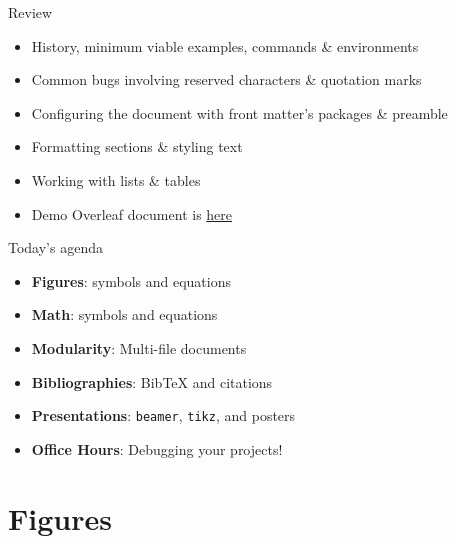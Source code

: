\documentclass{cubeamer}
\begin{document}
\begin{frame}{Review}
    \begin{itemize}
        \item History, minimum viable examples, commands \& environments
        \item Common bugs involving reserved characters \& quotation marks
        \item Configuring the document with front matter's packages \& preamble
        \item Formatting sections \& styling text
        \item Working with lists \& tables
        \item Demo Overleaf document is \href{https://www.overleaf.com/read/hktsjnvsyfks}{here}
    \end{itemize}
\end{frame}

\begin{frame}{Today's agenda}
    \begin{itemize}
        \item \textbf{Figures}: symbols and equations
        \item \textbf{Math}: symbols and equations
        \item \textbf{Modularity}: Multi-file documents
        \item \textbf{Bibliographies}: BibTeX and citations
        \item \textbf{Presentations}: \texttt{beamer}, \texttt{tikz}, and posters
        \item \textbf{Office Hours}: Debugging your projects!
    \end{itemize}
\end{frame}

\section{Figures}
\end{document}
